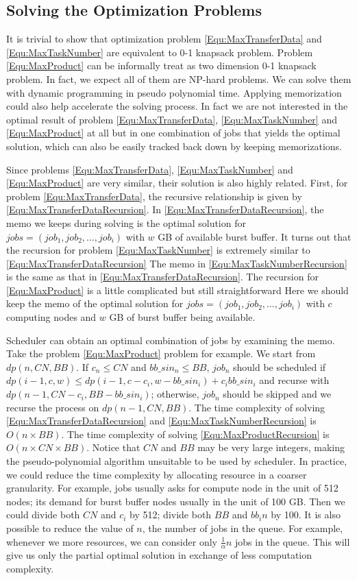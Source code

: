 \subsection{Solving the Optimization Problems}
It is trivial to show that optimization problem \ref{Equ:MaxTransferData} and \ref{Equ:MaxTaskNumber}
are equivalent to 0-1 knapsack problem.
Problem \ref{Equ:MaxProduct} can be informally treat as two dimension 0-1 knapsack problem.
In fact, we expect all of them are NP-hard problems.
We can solve them with dynamic programming in pseudo polynomial time.
Applying memorization could also help accelerate the solving process.
In fact we are not interested in the optimal result of problem \ref{Equ:MaxTransferData},
\ref{Equ:MaxTaskNumber} and \ref{Equ:MaxProduct} at all but in one combination of jobs
that yields the optimal solution, which can also be easily tracked back down by keeping memorizations.

Since problems \ref{Equ:MaxTransferData},
\ref{Equ:MaxTaskNumber} and \ref{Equ:MaxProduct} are very similar, 
their solution is also highly related.
First, for problem \ref{Equ:MaxTransferData}, the recursive relationship is given by \ref{Equ:MaxTransferDataRecursion}.
In \ref{Equ:MaxTransferDataRecursion}, the memo we keeps during solving is the optimal solution for 
$jobs=(job_1, job_2, \ldots, job_i)$ with $w$ GB of available burst buffer.
It turns out that the recursion for problem \ref{Equ:MaxTaskNumber} is extremely similar to \ref{Equ:MaxTransferDataRecursion}
The memo in \ref{Equ:MaxTaskNumberRecursion} is the same as that in \ref{Equ:MaxTransferDataRecursion}.
The recursion for \ref{Equ:MaxProduct} is a little complicated but still straightforward
Here we should keep the memo of the optimal solution for $jobs=(job_1, job_2, \ldots, job_i)$
with $c$ computing nodes and $w$ GB of burst buffer being available.

Scheduler can obtain an optimal combination of jobs by examining the memo.
Take the problem \ref{Equ:MaxProduct} problem for example.
We start from $dp(n, CN, BB)$.
If $c_n \leq CN$ and $bb\_sin_n \leq BB$, $job_n$ should be scheduled if
$dp(i-1, c, w) \leq dp(i-1, c - c_i, w-bb\_sin_i) + c_i bb\_sin_i$ and recurse with $dp(n-1, CN-c_i, BB-bb\_sin_i)$;
otherwise, $job_n$ should be skipped and we recurse the process on $dp(n-1, CN, BB)$.
The time complexity of solving \ref{Equ:MaxTransferDataRecursion} and \ref{Equ:MaxTaskNumberRecursion} is $O(n\times BB)$.
The time complexity of solving \ref{Equ:MaxProductRecursion} is $O(n\times CN\times BB)$.
Notice that $CN$ and $BB$ may be very large integers, making the pseudo-polynomial algorithm unsuitable
to be used by scheduler.
In practice, we could reduce the time complexity by allocating resource in a coarser granularity.
For example, jobs usually asks for compute node in the unit of 512 nodes;
its demand for burst buffer nodes usually in the unit of 100 GB.
Then we could divide both $CN$ and $c_i$ by 512; divide both $BB$ and $bb_in$ by 100.
It is also possible to reduce the value of $n$, the number of jobs in the queue.
For example, whenever we more resources, we can consider only $\frac{1}{\alpha}n$ jobs in the queue.
This will give us only the partial optimal solution in exchange of less computation complexity.




